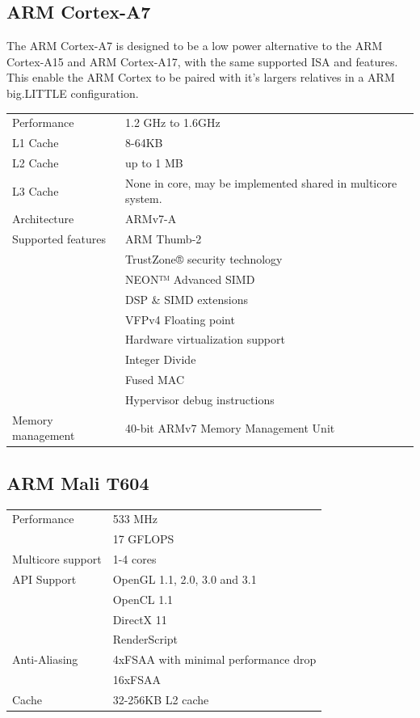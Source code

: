 \subsection{ARM Cortex-A7}
The ARM Cortex-A7 is designed to be a low power alternative to the ARM Cortex-A15 and ARM Cortex-A17, with the same supported ISA and features.
This enable the ARM Cortex to be paired with it's largers relatives in a ARM big.LITTLE configuration.
\begin{table}[H]
  \begin{tabular}{ll}
    Performance       & 1.2 GHz to 1.6GHz  \\
    L1 Cache          & 8-64KB \\
    L2 Cache          & up to 1 MB \\
    L3 Cache          & None in core, may be implemented shared in multicore system. \\
    Architecture      & ARMv7-A            \\
    Supported features& ARM Thumb-2 \\
                      & TrustZone® security technology \\
                      & NEON™ Advanced SIMD \\
                      & DSP \& SIMD extensions \\
                      & VFPv4 Floating point \\
                      & Hardware virtualization support \\
                      & Integer Divide \\
                      & Fused MAC \\
                      & Hypervisor debug instructions \\
    Memory management & 40-bit ARMv7 Memory Management Unit
  \end{tabular}
\end{table}
\subsection{ARM Mali T604}
\begin{table}[H]
  \begin{tabular}{ll}
    Performance       & 533 MHz\\
                      & 17 GFLOPS  \\
    Multicore support & 1-4 cores  \\
    API Support       & OpenGL 1.1, 2.0, 3.0 and 3.1  \\
                      & OpenCL 1.1  \\
                      & DirectX 11  \\
                      & RenderScript \\
    Anti-Aliasing     & 4xFSAA with minimal performance drop  \\
                      & 16xFSAA  \\
    Cache             & 32-256KB L2 cache
  \end{tabular}
\end{table}
